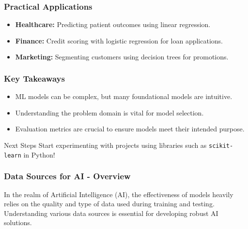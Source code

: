 \documentclass[aspectratio=169]{beamer}
\begin{document}
\begin{frame}[fragile]
    \frametitle{Practical Applications}
    \begin{itemize}
        \item \textbf{Healthcare:} Predicting patient outcomes using linear regression.
        \item \textbf{Finance:} Credit scoring with logistic regression for loan applications.
        \item \textbf{Marketing:} Segmenting customers using decision trees for promotions.
    \end{itemize}
\end{frame}

\begin{frame}[fragile]
    \frametitle{Key Takeaways}
    \begin{itemize}
        \item ML models can be complex, but many foundational models are intuitive.
        \item Understanding the problem domain is vital for model selection.
        \item Evaluation metrics are crucial to ensure models meet their intended purpose.
    \end{itemize}
    \begin{block}{Next Steps}
        Start experimenting with projects using libraries such as \texttt{scikit-learn} in Python!
    \end{block}
\end{frame}

\begin{frame}[fragile]
    \frametitle{Data Sources for AI - Overview}
    In the realm of Artificial Intelligence (AI), the effectiveness of models heavily relies on 
    the quality and type of data used during training and testing. Understanding various data 
    sources is essential for developing robust AI solutions.
\end{frame}
\end{document}
